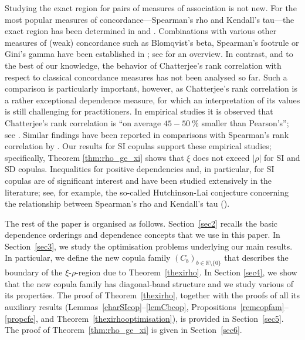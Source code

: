 \documentclass{article}
\theoremstyle{plain}
\theoremstyle{definition}
\begin{document}
Studying the exact region for pairs of measures of association is not new. For the most popular measures of concordance---Spearman's rho and Kendall's tau---the exact region has been determined in \cite{Durbin-Stuart-1951} and \cite{Schreyer-2017}. Combinations with various other measures of (weak) concordance such as Blomqvist's beta, Spearman's footrule or Gini's gamma have been established in \cite{Bukovsek-2022,Kokol-2023,Kokol-2024,Kokol-2021}; see \cite[Table 1]{Tschimpke-2025} for an overview.
In contrast, and to the best of our knowledge, the behavior of Chatterjee’s rank correlation with respect to classical concordance measures has not been analysed so far.
Such a comparison is particularly important, however, as Chatterjee’s rank correlation is a rather exceptional dependence measure, for which an interpretation of its values is still challenging for practitioners. 
In empirical studies it is observed that Chatterjee's rank correlation is ``on average \(45-50~\%\) smaller than Pearson's''; see \cite{sierra2025revised}. Similar findings have been reported in comparisons with Spearman’s rank correlation by \cite{Behnam-2022}.
Our results for SI copulas support these empirical studies; specifically, Theorem \ref{thm:rho_ge_xi} shows that \(\xi\) does not exceed \(|\rho|\) for SI and SD copulas.
Inequalities for positive dependencies and, in particular, for SI copulas are of significant interest and have been studied extensively in the literature; see, for example, the so-called Hutchinson-Lai conjecture concerning the relationship between Spearman's rho and Kendall's tau (\cite{Balakrishnan-2009,Munroe-2010,Hurlimann-2003}).

The rest of the paper is organised as follows. Section~\ref{sec2} recalls the basic dependence orderings and dependence concepts that we use in this paper. In Section~\ref{sec3}, we study the optimisation problems underlying our main results. In particular, we define the new copula family \((C_b)_{b\in {\mathbb{R}}\setminus \{0\}}\) that describes the boundary of the \(\xi\)-\(\rho\)-region due to Theorem~\ref{thexirho}.
In Section \ref{sec4}, we show that the new copula family has diagonal-band structure and we study various of its properties. 
The proof of Theorem~\ref{thexirho}, together with the proofs of all its auxiliary results
(Lemmas~\ref{charSIcop}--\ref{lemCbcop}, Propositions~\ref{remcopfam}--\ref{propcfe},
and Theorem~\ref{thexirhooptimisation}), is provided in Section~\ref{sec5}.
The proof of Theorem~\ref{thm:rho_ge_xi} is given in Section~\ref{sec6}.
\end{document}
